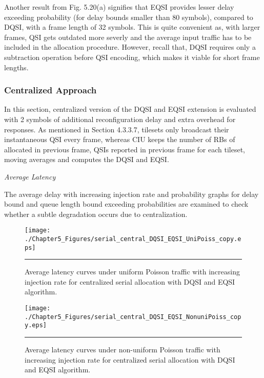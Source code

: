 Another result from Fig. 5.20(a) signifies that EQSI provides lesser delay exceeding probability (for delay bounds smaller than 80 symbols), compared to DQSI, with a frame length of 32 symbols. This is quite convenient as, with larger frames, QSI gets outdated more severly and the average input traffic has to be included in the allocation procedure. However, recall that, DQSI requires only a subtraction operation before QSI encoding, which makes it viable for short frame lengths.

\subsubsection{Centralized Approach}
In this section, centralized version of the DQSI and EQSI extension is evaluated with 2 symbols of additional reconfiguration delay and extra overhead for responses. As mentioned in Section 4.3.3.7, tilesets only broadcast their instantaneous QSI every frame, whereas CIU keeps the number of RBs of allocated in previous frame, QSIs reported in previous frame for each tileset, moving averages and computes the DQSI and EQSI. 

\textit{Average Latency}


The average delay with increasing injection rate and probability graphs for delay bound and queue length bound exceeding probabilities are examined to check whether a subtle degradation occurs due to centralization. 

\begin{figure}[htbp]
  \centering
    \texttt{[image: ./Chapter5\_Figures/serial\_central\_DQSI\_EQSI\_UniPoiss\_copy.eps]}
    \rule{35em}{0.5pt}
  \caption[Centralized Serial allocation with DQSI and EQSI average latency under uniform Poisson]{Average latency curves under uniform Poisson traffic with increasing injection rate for centralized serial allocation with DQSI and EQSI algorithm.}
  \label{fig:Electron}
\end{figure}


\begin{figure}[htbp]
  \centering
    \texttt{[image: ./Chapter5\_Figures/serial\_central\_DQSI\_EQSI\_NonuniPoiss\_copy.eps]}
    \rule{35em}{0.5pt}
  \caption[Centralized Serial DQSI and EQSI allocation average latency under non-uniform Poisson]{Average latency curves under non-uniform Poisson traffic with increasing injection rate for centralized serial allocation with DQSI and EQSI algorithm.}
  \label{fig:Electron}
\end{figure}



